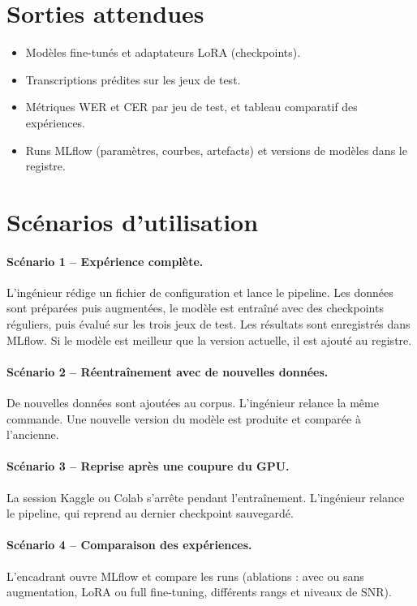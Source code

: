 \documentclass[12pt,a4paper]{report}
\begin{document}
\section{Sorties attendues}
\begin{itemize}
  \item Modèles fine-tunés et adaptateurs LoRA (checkpoints).
  \item Transcriptions prédites sur les jeux de test.
  \item Métriques WER et CER par jeu de test, et tableau comparatif des expériences.
  \item Runs MLflow (paramètres, courbes, artefacts) et versions de modèles dans
        le registre.
\end{itemize}

\section{Scénarios d'utilisation}
\paragraph{Scénario 1 -- Expérience complète.}
L'ingénieur rédige un fichier de configuration et lance le pipeline. Les données
sont préparées puis augmentées, le modèle est entraîné avec des checkpoints
réguliers, puis évalué sur les trois jeux de test. Les résultats sont enregistrés
dans MLflow. Si le modèle est meilleur que la version actuelle, il est ajouté au
registre.

\paragraph{Scénario 2 -- Réentraînement avec de nouvelles données.}
De nouvelles données sont ajoutées au corpus. L'ingénieur relance la même commande.
Une nouvelle version du modèle est produite et comparée à l'ancienne.

\paragraph{Scénario 3 -- Reprise après une coupure du GPU.}
La session Kaggle ou Colab s'arrête pendant l'entraînement. L'ingénieur relance le
pipeline, qui reprend au dernier checkpoint sauvegardé.

\paragraph{Scénario 4 -- Comparaison des expériences.}
L'encadrant ouvre MLflow et compare les runs (ablations : avec ou sans augmentation,
LoRA ou full fine-tuning, différents rangs et niveaux de SNR).
\end{document}
